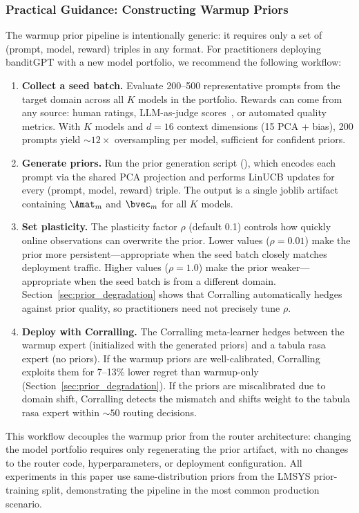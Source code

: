 \subsubsection{Practical Guidance: Constructing Warmup Priors}
\label{sec:prior_guidance}

The warmup prior pipeline is intentionally generic: it requires only a set of (prompt, model, reward) triples in any format.
For practitioners deploying banditGPT with a new model portfolio, we recommend the following workflow:

\begin{enumerate}[nosep]
\item \textbf{Collect a seed batch.}
Evaluate 200--500 representative prompts from the target domain across all $K$ models in the portfolio.
Rewards can come from any source: human ratings, LLM-as-judge scores~\cite{zheng2023judging}, or automated quality metrics.
With $K$ models and $d{=}16$ context dimensions (15 PCA + bias), 200 prompts yield ${\sim}12\times$ oversampling per model, sufficient for confident priors.

\item \textbf{Generate priors.}
Run the prior generation script (), which encodes each prompt via the shared PCA projection and performs LinUCB updates for every (prompt, model, reward) triple.
The output is a single joblib artifact containing $\Amat_m$ and $\bvec_m$ for all $K$ models.

\item \textbf{Set plasticity.}
The plasticity factor $\rho$ (default 0.1) controls how quickly online observations can overwrite the prior.
Lower values ($\rho{=}0.01$) make the prior more persistent---appropriate when the seed batch closely matches deployment traffic.
Higher values ($\rho{=}1.0$) make the prior weaker---appropriate when the seed batch is from a different domain.
Section~\ref{sec:prior_degradation} shows that Corralling automatically hedges against prior quality, so practitioners need not precisely tune $\rho$.

\item \textbf{Deploy with Corralling.}
The Corralling meta-learner hedges between the warmup expert (initialized with the generated priors) and a tabula rasa expert (no priors).
If the warmup priors are well-calibrated, Corralling exploits them for 7--13\% lower regret than warmup-only (Section~\ref{sec:prior_degradation}).
If the priors are miscalibrated due to domain shift, Corralling detects the mismatch and shifts weight to the tabula rasa expert within ${\sim}50$ routing decisions.
\end{enumerate}

\noindent This workflow decouples the warmup prior from the router architecture: changing the model portfolio requires only regenerating the prior artifact, with no changes to the router code, hyperparameters, or deployment configuration.
All experiments in this paper use same-distribution priors from the LMSYS prior-training split, demonstrating the pipeline in the most common production scenario.
